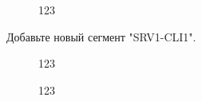 \documentclass[a4paper, 12pt]{report}
\begin{document}
	\begin{figure}[h]
		\caption{123}
		\label{fig:image}
	\end{figure}

	\clearpage

	Добавьте новый сегмент "SRV1-CLI1".
	
	\begin{figure}[h]
		\caption{123}
		\label{fig:image}
	\end{figure}
	
	\begin{figure}[h]
		\caption{123}
		\label{fig:image}
	\end{figure}
	
\end{document}
